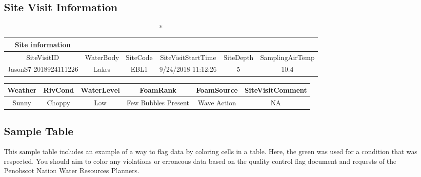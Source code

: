 \documentclass[
  letterpaper,
  DIV=11,
  numbers=noendperiod]{scrartcl}
\begin{document}
\hypertarget{site-visit-information}{%
\subsection{Site Visit Information}\label{site-visit-information}}

\begin{longtable*}{cccccc}
\caption*{
{\large Site information}
} \\ 
\toprule
SiteVisitID & WaterBody & SiteCode & SiteVisitStartTime & SiteDepth & SamplingAirTemp \\ 
\midrule\addlinespace[2.5pt]
JasonS7-2018924111226 & Lakes & EBL1 & 9/24/2018 11:12:26 & 5 & 10.4 \\ 
\bottomrule
\end{longtable*}

\begin{longtable*}{cccccc}
\toprule
Weather & RivCond & WaterLevel & FoamRank & FoamSource & SiteVisitComment \\ 
\midrule\addlinespace[2.5pt]
Sunny & Choppy & Low & Few Bubbles Present & Wave Action & NA \\ 
\bottomrule
\end{longtable*}

\hypertarget{sample-table}{%
\subsection{Sample Table}\label{sample-table}}

This sample table includes an example of a way to flag data by coloring
cells in a table. Here, the green was used for a condition that was
respected. You should aim to color any violations or erroneous data
based on the quality control flag document and requests of the Penobscot
Nation Water Resources Planners.
\end{document}
